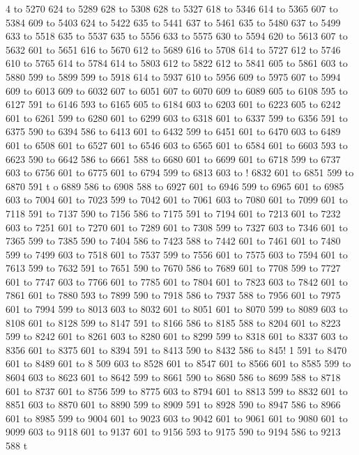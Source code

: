 4 to 5270 624 to 5289 628 to 5308 628 to 5327 618 to 5346 614 to 5365 607 to 5384 609 to 5403 624 to 5422 635 to 5441 637 to 5461 635 to 5480 637 to 5499 633 to 5518 635 to 5537 635 to 5556 633 to 5575 630 to 5594 620 to 5613 607 to 5632 601 to 5651 616 to 5670 612 to 5689 616 to 5708 614 to 5727 612 to 5746 610 to 5765 614 to 5784 614 to 5803 612 to 5822 612 to 5841 605 to 5861 603 to 5880 599 to 5899 599 to 5918 614 to 5937 610 to 5956 609 to 5975 607 to 5994 609 to 6013 609 to 6032 607 to 6051 607 to 6070 609 to 6089 605 to 6108 595 to 6127 591 to 6146 593 to 6165 605 to 6184 603 to 6203 601 to 6223 605 to 6242 601 to 6261 599 to 6280 601 to 6299 603 to 6318 601 to 6337 599 to 6356 591 to 6375 590 to 6394 586 to 6413 601 to 6432 599 to 6451 601 to 6470 603 to 6489 601 to 6508 601 to 6527 601 to 6546 603 to 6565 601 to 6584 601 to 6603 593 to 6623 590 to 6642 586 to 6661 588 to 6680 601 to 6699 601 to 6718 599 to 6737 603 to 6756 601 to 6775 601 to 6794 599 to 6813 603 to !
6832 601 to 6851 599 to 6870 591 t
o 6889 586 to 6908 588 to 6927 601 to 6946 599 to 6965 601 to 6985 603 to 7004 601 to 7023 599 to 7042 601 to 7061 603 to 7080 601 to 7099 601 to 7118 591 to 7137 590 to 7156 586 to 7175 591 to 7194 601 to 7213 601 to 7232 603 to 7251 601 to 7270 601 to 7289 601 to 7308 599 to 7327 603 to 7346 601 to 7365 599 to 7385 590 to 7404 586 to 7423 588 to 7442 601 to 7461 601 to 7480 599 to 7499 603 to 7518 601 to 7537 599 to 7556 601 to 7575 603 to 7594 601 to 7613 599 to 7632 591 to 7651 590 to 7670 586 to 7689 601 to 7708 599 to 7727 601 to 7747 603 to 7766 601 to 7785 601 to 7804 601 to 7823 603 to 7842 601 to 7861 601 to 7880 593 to 7899 590 to 7918 586 to 7937 588 to 7956 601 to 7975 601 to 7994 599 to 8013 603 to 8032 601 to 8051 601 to 8070 599 to 8089 603 to 8108 601 to 8128 599 to 8147 591 to 8166 586 to 8185 588 to 8204 601 to 8223 599 to 8242 601 to 8261 603 to 8280 601 to 8299 599 to 8318 601 to 8337 603 to 8356 601 to 8375 601 to 8394 591 to 8413 590 to 8432 586 to 845!
1 591 to 8470 601 to 8489 601 to 8
509 603 to 8528 601 to 8547 601 to 8566 601 to 8585 599 to 8604 603 to 8623 601 to 8642 599 to 8661 590 to 8680 586 to 8699 588 to 8718 601 to 8737 601 to 8756 599 to 8775 603 to 8794 601 to 8813 599 to 8832 601 to 8851 603 to 8870 601 to 8890 599 to 8909 591 to 8928 590 to 8947 586 to 8966 601 to 8985 599 to 9004 601 to 9023 603 to 9042 601 to 9061 601 to 9080 601 to 9099 603 to 9118 601 to 9137 601 to 9156 593 to 9175 590 to 9194 586 to 9213 588 t
